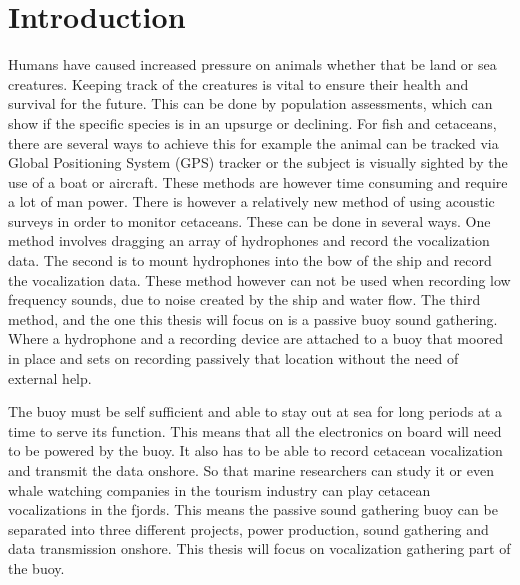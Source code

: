 \chapter{Introduction\label{cha:introduction}}




Humans have caused increased pressure on animals whether that be land or sea creatures.
Keeping track of the creatures is vital to ensure their health and survival for the future.
This can be done by population assessments, which can show if the specific species is in an upsurge or declining.
For fish and cetaceans, there are several ways to achieve this for example the animal can be tracked via Global Positioning System (GPS) tracker or the subject is visually sighted by the use of a boat or aircraft.
These methods are however time consuming and require a lot of man power.
There is however a relatively new method of using  acoustic surveys in order to monitor cetaceans.
These can be done in several ways.
One method involves dragging an array of hydrophones and record the vocalization data.
The second is to mount hydrophones into the bow of the ship and record the vocalization data.
These method however can not be used when recording low frequency sounds, due to noise created by the ship and water flow.
The third method, and the one this thesis will focus on is a passive buoy sound gathering.
Where a hydrophone and a recording device are attached to a buoy that moored in place and sets on recording passively that location without the need of external help.

The buoy must be self sufficient and able to stay out at sea for long periods at a time to serve its function.
This means that all the electronics on board will need to be powered by the buoy.
It also has to be able to record cetacean vocalization and transmit the data onshore.
So that marine researchers can study it or even whale watching companies in the tourism industry can play cetacean vocalizations in the fjords.
This means the passive sound gathering buoy can be separated into three different projects, power production, sound gathering and data transmission onshore.
This thesis will focus on vocalization gathering part of the buoy.

